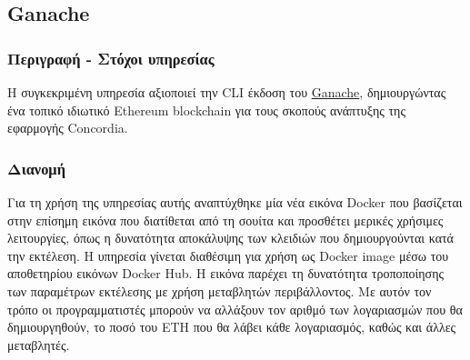 \subsection{Ganache} \label{subsection:4-3-6-ganache-service}

\subsubsection{Περιγραφή - Στόχοι υπηρεσίας}

Η συγκεκριμένη υπηρεσία αξιοποιεί την CLI έκδοση του \hyperref[subsection:4-2-3-2-ganache]{Ganache}, δημιουργώντας ένα τοπικό ιδιωτικό Ethereum blockchain για τους σκοπούς ανάπτυξης της εφαρμογής Concordia.

\subsubsection{Διανομή}

Για τη χρήση της υπηρεσίας αυτής αναπτύχθηκε μία νέα εικόνα Docker που βασίζεται στην επίσημη εικόνα που διατίθεται από τη σουίτα και προσθέτει μερικές χρήσιμες λειτουργίες, όπως η δυνατότητα αποκάλυψης των κλειδιών που δημιουργούνται κατά την εκτέλεση. Η υπηρεσία γίνεται διαθέσιμη για χρήση ως Docker image μέσω του αποθετηρίου εικόνων Docker Hub. Η εικόνα παρέχει τη δυνατότητα τροποποίησης των παραμέτρων εκτέλεσης με χρήση μεταβλητών περιβάλλοντος. Με αυτόν τον τρόπο οι προγραμματιστές μπορούν να αλλάξουν τον αριθμό των λογαριασμών που θα δημιουργηθούν, το ποσό του ETH που θα λάβει κάθε λογαριασμός, καθώς και άλλες μεταβλητές.